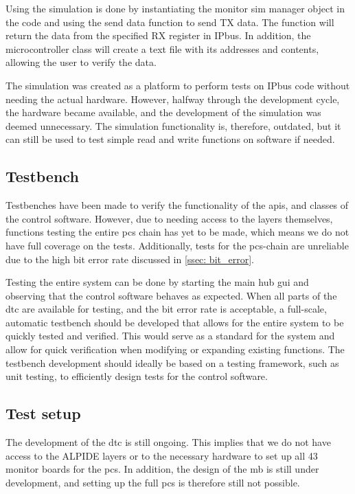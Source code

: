 \documentclass[main.tex]{subfiles}
\begin{document}
Using the simulation is done by instantiating the monitor sim manager object in the code and using the send data function to send TX data. The function will return the data from the specified RX register in IPbus. In addition, the microcontroller class will create a text file with its addresses and contents, allowing the user to verify the data.

The simulation was created as a platform to perform tests on IPbus code without needing the actual hardware. However, halfway through the development cycle, the hardware became available, and the development of the simulation was deemed unnecessary. The simulation functionality is, therefore, outdated, but it can still be used to test simple read and write functions on software if needed.


\subsection{Testbench}

Testbenches have been made to verify the functionality of the \gls{api}s, and classes of the control software. However, due to needing access to the layers themselves, functions testing the entire \gls{pcs} chain has yet to be made, which means we do not have full coverage on the tests. Additionally, tests for the \gls{pcs}-chain are unreliable due to the high bit error rate discussed in \autoref{ssec: bit_error}.

Testing the entire system can be done by starting the main hub \gls{gui} and observing that the control software behaves as expected. When all parts of the \gls{dtc} are available for testing, and the bit error rate is acceptable, a full-scale, automatic testbench should be developed that allows for the entire system to be quickly tested and verified. This would serve as a standard for the system and allow for quick verification when modifying or expanding existing functions. The testbench development should ideally be based on a testing framework, such as unit testing\cite{unit_test}, to efficiently design tests for the control software.




\subsection{Test setup}
\label{ssec: test_setup}

The development of the \gls{dtc} is still ongoing. This implies that we do not have access to the ALPIDE layers or to the necessary hardware to set up all 43 monitor boards for the \gls{pcs}. In addition, the design of the \gls{mb} is still under development, and setting up the full \gls{pcs} is therefore still not possible.
\end{document}
